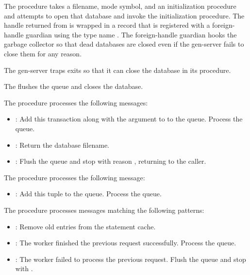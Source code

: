  The  procedure takes a filename, mode
symbol, and an initialization procedure and attempts to open that
database and invoke the initialization procedure.  The handle returned
from  is wrapped in a  record
that is registered with a foreign-handle guardian using the type name
.  The foreign-handle guardian hooks the garbage
collector so that dead databases are closed even if the 
gen-server fails to close them for any reason.

The gen-server traps exits so that it can close the database in its
 procedure.

 The  flushes the queue and
closes the database.

 The  procedure
processes the following messages:

\antipar\begin{itemize}

\item {}: Add this transaction along
  with the  argument to  to the queue.
  Process the queue.

\item {}: Return the database filename.

\item {}: Flush the queue and stop with reason
  , returning  to the caller.

\end{itemize}

 The  procedure
processes the following message:

\antipar\begin{itemize}

\item {}: Add this tuple to
  the queue. Process the queue.

\end{itemize}

 The  procedure
processes messages matching the following patterns:

\antipar\begin{itemize}

\item {}: Remove old entries from the statement cache.

\item {}: The worker finished
  the previous request successfully. Process the queue.

\item {}: The worker
  failed to process the previous request. Flush the queue and stop
  with .

\end{itemize}

